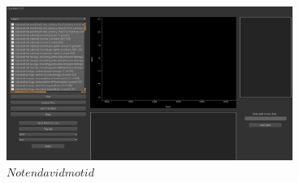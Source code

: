 \documentclass[paper=a4, fontsize=11pt]{scrartcl}
\begin{document}
\begin{figure}[H]
\begin{center}
\includegraphics[height=50mm]{images/gui_front.jpg}
\caption{$ Notendavidmotid $\label{fig:gui}}
\end{center}
\end{figure}
\end{document}
